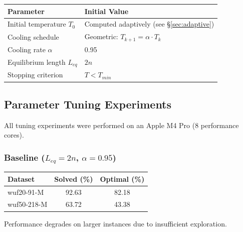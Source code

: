 \documentclass[11pt]{article}
\begin{document}
    \begin{center}
        \begin{tabular}{ll}
            \toprule
            Parameter                   & Initial Value                                  \\
            \midrule
            Initial temperature $T_0$   & Computed adaptively (see \S\ref{sec:adaptive}) \\
            Cooling schedule            & Geometric: $T_{k+1} = \alpha \cdot T_k$        \\
            Cooling rate $\alpha$       & 0.95                                           \\
            Equilibrium length $L_{eq}$ & $2n$                                           \\
            Stopping criterion          & $T < T_{min}$                                  \\
            \bottomrule
        \end{tabular}
    \end{center}

    \subsection{Parameter Tuning Experiments}

    All tuning experiments were performed on an Apple M4 Pro (8 performance cores).

    \subsubsection{Baseline (\texorpdfstring{$L_{eq} = 2n$}{Leq = 2n}, \texorpdfstring{$\alpha = 0.95$}{alpha = 0.95})}

    \begin{center}
        \begin{tabular}{lcc}
            \toprule
            Dataset     & Solved (\%) & Optimal (\%) \\
            \midrule
            wuf20-91-M  & 92.63       & 82.18        \\
            wuf50-218-M & 63.72       & 43.38        \\
            \bottomrule
        \end{tabular}
    \end{center}

    \noindent Performance degrades on larger instances due to insufficient exploration.
\end{document}
